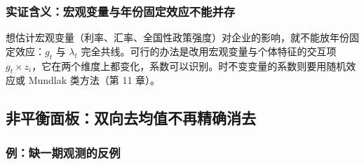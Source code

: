 \subsubsection{实证含义：宏观变量与年份固定效应不能并存}

想估计宏观变量（利率、汇率、全国性政策强度）对企业的影响，就不能放年份固定效应：$g_t$ 与 $\lambda_t$ 完全共线。可行的办法是改用宏观变量与个体特征的交互项 $g_t\times z_i$，它在两个维度上都变化，系数可以识别。时不变变量的系数则要用随机效应或 Mundlak 类方法（第 11 章）。

\subsection{非平衡面板：双向去均值不再精确消去}\label{sec:U10b-unbal}

\subsubsection{例：缺一期观测的反例}

